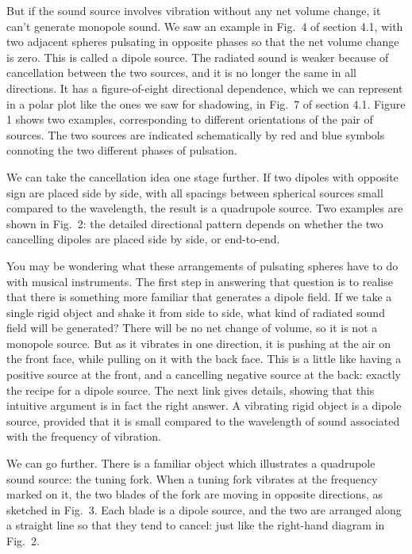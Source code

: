   But if the sound source involves vibration without any net volume change, it 
  can't generate monopole sound. We saw an example in Fig.\ 4 of section 4.1, 
  with two adjacent spheres pulsating in opposite phases so that the net volume 
  change is zero. This is called a dipole source. The radiated sound is weaker 
  because of cancellation between the two sources, and it is no longer the same 
  in all directions. It has a figure-of-eight directional dependence, which we 
  can represent in a polar plot like the ones we saw for shadowing, in Fig.\ 7 
  of section 4.1. Figure 1 shows two examples, corresponding to different 
  orientations of the pair of sources. The two sources are indicated 
  schematically by red and blue symbols connoting the two different phases of 
  pulsation. 

  We can take the cancellation idea one stage further. If two dipoles with 
  opposite sign are placed side by side, with all spacings between spherical 
  sources small compared to the wavelength, the result is a quadrupole source. 
  Two examples are shown in Fig.\ 2: the detailed directional pattern depends 
  on whether the two cancelling dipoles are placed side by side, or end-to-end. 

  You may be wondering what these arrangements of pulsating spheres have to do 
  with musical instruments. The first step in answering that question is to 
  realise that there is something more familiar that generates a dipole field. 
  If we take a single rigid object and shake it from side to side, what kind of 
  radiated sound field will be generated? There will be no net change of 
  volume, so it is not a monopole source. But as it vibrates in one direction, 
  it is pushing at the air on the front face, while pulling on it with the back 
  face. This is a little like having a positive source at the front, and a 
  cancelling negative source at the back: exactly the recipe for a dipole 
  source. The next link gives details, showing that this intuitive argument is 
  in fact the right answer. A vibrating rigid object is a dipole source, 
  provided that it is small compared to the wavelength of sound associated with 
  the frequency of vibration. 

  We can go further. There is a familiar object which illustrates a quadrupole 
  sound source: the tuning fork. When a tuning fork vibrates at the frequency 
  marked on it, the two blades of the fork are moving in opposite directions, 
  as sketched in Fig.\ 3. Each blade is a dipole source, and the two are 
  arranged along a straight line so that they tend to cancel: just like the 
  right-hand diagram in Fig.\ 2. 

